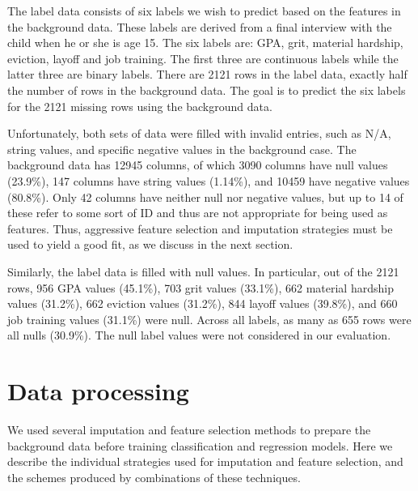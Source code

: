 \documentclass{article} %
\begin{document}
The label data consists of six labels we wish to predict based on the features in the background data. These labels are derived from a final interview with the child when he or she is age 15. The six labels are: GPA, grit, material hardship, eviction, layoff and job training. The first three are continuous labels while the latter three are binary labels. There are 2121 rows in the label data, exactly half the number of rows in the background data. The goal is to predict the six labels for the 2121 missing rows using the background data.

Unfortunately, both sets of data were filled with invalid entries, such as N/A, string values, and specific negative values in the background case. The background data has 12945 columns, of which 3090 columns have null values (23.9\%), 147 columns have string values (1.14\%), and 10459 have negative values (80.8\%). Only 42 columns have neither null nor negative values, but up to 14 of these refer to some sort of ID and thus are not appropriate for being used as features. Thus, aggressive feature selection and imputation strategies must be used to yield a good fit, as we discuss in the next section. 

Similarly, the label data is filled with null values. In particular, out of the 2121 rows, 956 GPA values (45.1\%), 703 grit values (33.1\%), 662 material hardship values (31.2\%), 662 eviction values (31.2\%), 844 layoff values (39.8\%), and 660 job training values (31.1\%) were null. Across all labels, as many as 655 rows were all nulls (30.9\%). The null label values were not considered in our evaluation.

\section{Data processing}
\label{sec:datapreprocessing}

We used several imputation and feature selection methods to prepare the background data before training classification and regression models. Here we describe the individual strategies used for imputation and feature selection, and the schemes produced by combinations of these techniques.

\end{document}
